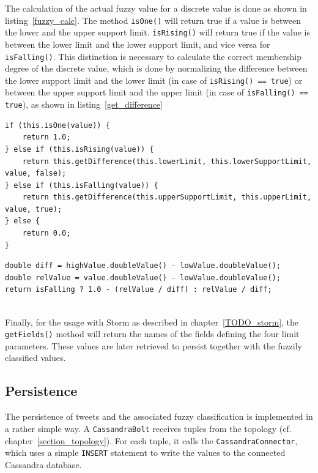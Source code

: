 \documentclass[a4paper]{article}
\begin{document}
The calculation of the actual fuzzy value for a discrete value is done as shown in listing~\ref{fuzzy_calc}. The method \texttt{isOne()} will return true if a value is between the lower and the upper support limit. \texttt{isRising()} will return true if the value is between the lower limit and the lower support limit, and vice versa for \texttt{isFalling()}. This distinction is necessary to calculate the correct membership degree of the discrete value, which is done by normalizing the difference between the lower support limit and the lower limit (in case of \texttt{isRising() == true}) or between the upper support limit and the upper limit (in case of \texttt{isFalling() == true}), as shown in listing~\ref{get_difference}
\begin{lstlisting}
if (this.isOne(value)) {
	return 1.0;
} else if (this.isRising(value)) {
	return this.getDifference(this.lowerLimit, this.lowerSupportLimit, value, false);
} else if (this.isFalling(value)) {
	return this.getDifference(this.upperSupportLimit, this.upperLimit, value, true);
} else {
	return 0.0;
}
\end{lstlisting}
\begin{lstlisting}
double diff = highValue.doubleValue() - lowValue.doubleValue();
double relValue = value.doubleValue() - lowValue.doubleValue();
return isFalling ? 1.0 - (relValue / diff) : relValue / diff;
 
\end{lstlisting}

Finally, for the usage with Storm as described in chapter~\ref{TODO_storm}, the \texttt{getFields()} method will return the names of the fields defining the four limit parameters. These values are later retrieved to persist together with the fuzzily classified values.

\subsection{Persistence}
The persistence of tweets and the associated fuzzy classification is implemented in a rather simple way. A \texttt{CassandraBolt} receives tuples from the topology (cf. chapter~\ref{section_topology}). For each tuple, it calls the \texttt{CassandraConnector}, which uses a simple \texttt{INSERT} statement to write the values to the connected Cassandra database.
\end{document}
